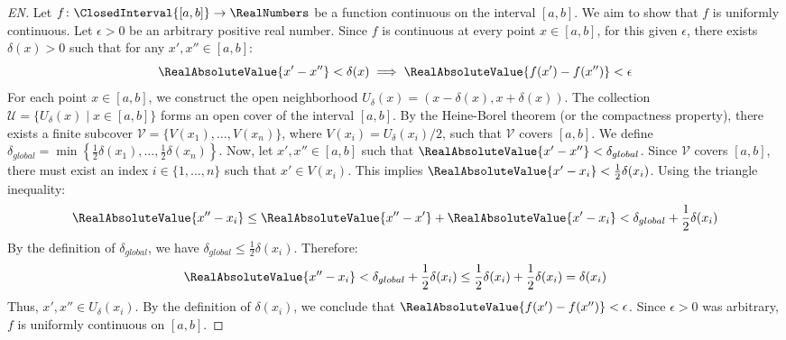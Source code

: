 \begin{proof}[EN]
Let $f \colon \ClosedInterval{[a,b]} \to \RealNumbers$ be a function continuous on the interval $[a, b]$. We aim to show that $f$ is uniformly continuous.
Let $\epsilon > 0$ be an arbitrary positive real number.
Since $f$ is continuous at every point $x \in [a, b]$, for this given $\epsilon$, there exists $\delta(x) > 0$ such that for any $x', x'' \in [a, b]$:
\[ \RealAbsoluteValue{x' - x''} < \delta(x) \implies \RealAbsoluteValue{f(x') - f(x'')} < \epsilon \]
For each point $x \in [a, b]$, we construct the open neighborhood $U_\delta(x) = (x - \delta(x), x + \delta(x))$. The collection $\mathcal{U} = \{U_\delta(x) \mid x \in [a, b]\}$ forms an open cover of the interval $[a, b]$.
By the Heine-Borel theorem (or the compactness property), there exists a finite subcover $\mathcal{V} = \{V(x_1), \dots, V(x_n)\}$, where $V(x_i) = U_\delta(x_i)/2$, such that $\mathcal{V}$ covers $[a, b]$.
We define $\delta_{global} = \min \left\{ \frac{1}{2}\delta(x_1), \dots, \frac{1}{2}\delta(x_n) \right\}$.
Now, let $x', x'' \in [a, b]$ such that $\RealAbsoluteValue{x' - x''} < \delta_{global}$.
Since $\mathcal{V}$ covers $[a, b]$, there must exist an index $i \in \{1, \dots, n\}$ such that $x' \in V(x_i)$.
This implies $\RealAbsoluteValue{x' - x_i} < \frac{1}{2}\delta(x_i)$.
Using the triangle inequality:
\[ \RealAbsoluteValue{x'' - x_i} \leq \RealAbsoluteValue{x'' - x'} + \RealAbsoluteValue{x' - x_i} < \delta_{global} + \frac{1}{2}\delta(x_i) \]
By the definition of $\delta_{global}$, we have $\delta_{global} \leq \frac{1}{2}\delta(x_i)$. Therefore:
\[ \RealAbsoluteValue{x'' - x_i} < \delta_{global} + \frac{1}{2}\delta(x_i) \leq \frac{1}{2}\delta(x_i) + \frac{1}{2}\delta(x_i) = \delta(x_i) \]
Thus, $x', x'' \in U_\delta(x_i)$.
By the definition of $\delta(x_i)$, we conclude that $\RealAbsoluteValue{f(x') - f(x'')} < \epsilon$.
Since $\epsilon > 0$ was arbitrary, $f$ is uniformly continuous on $[a, b]$.
\end{proof}